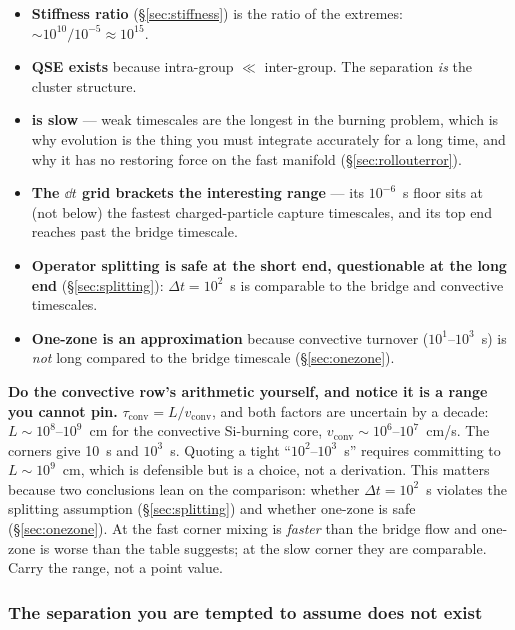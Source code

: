 \begin{itemize}
\item \textbf{Stiffness ratio} (\S\ref{sec:stiffness}) is the ratio of the
      extremes: ${\sim}10^{10}/10^{-5} \approx 10^{15}$.
\item \textbf{QSE exists} because intra-group $\ll$ inter-group. The separation
      \emph{is} the cluster structure.
\item \textbf{\Ye{} is slow} --- weak timescales are the longest in the burning
      problem, which is why \Ye{} evolution is the thing you must integrate
      accurately for a long time, and why it has no restoring force on the fast
      manifold (\S\ref{sec:rollouterror}).
\item \textbf{The $\dd t$ grid brackets the interesting range} --- its
      $10^{-6}$~s floor sits at (not below) the fastest charged-particle capture
      timescales, and its top end reaches past the bridge timescale.
\item \textbf{Operator splitting is safe at the short end, questionable at the
      long end} (\S\ref{sec:splitting}): $\Delta t = 10^{2}$~s is comparable to
      the bridge and convective timescales.
\item \textbf{One-zone is an approximation} because convective turnover
      ($10^{1}$--$10^{3}$~s) is \emph{not} long compared to the bridge timescale
      (\S\ref{sec:onezone}).
\end{itemize}

\begin{warn}
\textbf{Do the convective row's arithmetic yourself, and notice it is a range
you cannot pin.} $\tau_{\mathrm{conv}} = L/v_{\mathrm{conv}}$, and both factors
are uncertain by a decade: $L \sim 10^{8}$--$10^{9}$~cm for the convective
Si-burning core, $v_{\mathrm{conv}} \sim 10^{6}$--$10^{7}$~cm/s. The corners
give 10~s and $10^{3}$~s. Quoting a tight ``$10^{2}$--$10^{3}$~s'' requires
committing to $L \sim 10^{9}$~cm, which is defensible but is a choice, not a
derivation. This matters because two conclusions lean on the comparison:
whether $\Delta t = 10^{2}$~s violates the splitting assumption
(\S\ref{sec:splitting}) and whether one-zone is safe (\S\ref{sec:onezone}). At
the fast corner mixing is \emph{faster} than the bridge flow and one-zone is
worse than the table suggests; at the slow corner they are comparable. Carry
the range, not a point value.
\end{warn}

\subsubsection{The separation you are tempted to assume does not exist}
\label{sec:nogap}

